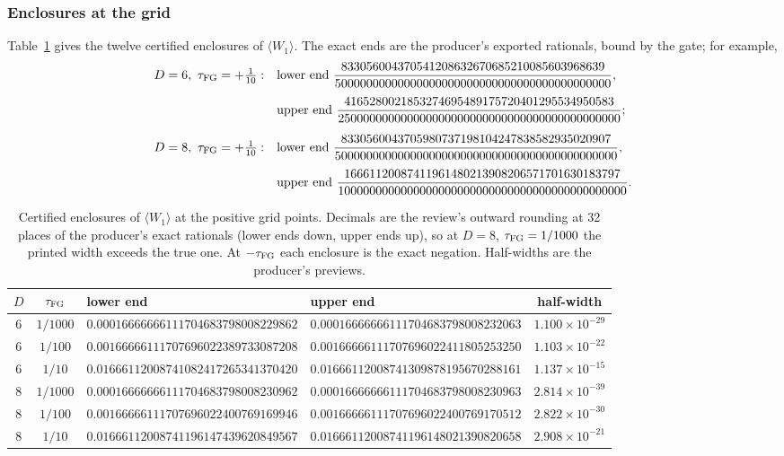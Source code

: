 \subsubsection{Enclosures at the grid}
\label{sec:az2-enclosures}
Table~\ref{tab:az2-enclosures} gives the twelve certified enclosures of
$\langle W_1\rangle$. The exact ends are the producer's exported rationals,
bound by the gate; for example,
\begin{equation}
 \begin{aligned}
 D=6,\ \tau_{\mathrm{FG}}=+\tfrac1{10}:\quad&\text{lower end }
 \frac{833056004370541208632670685210085603968639}{50000000000000000000000000000000000000000000},\\[4pt]
 &\text{upper end }
 \frac{4165280021853274695489175720401295534950583}{250000000000000000000000000000000000000000000};\\[6pt]
 D=8,\ \tau_{\mathrm{FG}}=+\tfrac1{10}:\quad&\text{lower end }
 \frac{8330560043705980737198104247838582935020907}{500000000000000000000000000000000000000000000},\\[4pt]
 &\text{upper end }
 \frac{16661120087411961480213908206571701630183797}{1000000000000000000000000000000000000000000000}.
 \end{aligned}
 \label{eq:az2-example}
\end{equation}

\begin{table}[htbp]
\centering\footnotesize
\caption{Certified enclosures of $\langle W_1\rangle$ at the positive grid
points. Decimals are the review's outward rounding at 32 places of the
producer's exact rationals (lower ends down, upper ends up), so at $D=8$,
$\tau_{\mathrm{FG}}=1/1000$ the printed width exceeds the true one. At $-\tau_{\mathrm{FG}}$ each
enclosure is the exact negation. Half-widths are the producer's previews.}
\label{tab:az2-enclosures}
\begin{tabular}{@{}ccllc@{}}
\toprule
$D$ & $\tau_{\mathrm{FG}}$ & lower end & upper end & half-width\\
\midrule
6 & $1/1000$ & $0.00016666666111704683798008229862$ & $0.00016666666111704683798008232063$ & $1.100\times10^{-29}$\\
6 & $1/100$ & $0.00166666111707696022389733087208$ & $0.00166666111707696022411805253250$ & $1.103\times10^{-22}$\\
6 & $1/10$ & $0.01666112008741082417265341370420$ & $0.01666112008741309878195670288161$ & $1.137\times10^{-15}$\\[2pt]
8 & $1/1000$ & $0.00016666666111704683798008230962$ & $0.00016666666111704683798008230963$ & $2.814\times10^{-39}$\\
8 & $1/100$ & $0.00166666111707696022400769169946$ & $0.00166666111707696022400769170512$ & $2.822\times10^{-30}$\\
8 & $1/10$ & $0.01666112008741196147439620849567$ & $0.01666112008741196148021390820658$ & $2.908\times10^{-21}$\\
\bottomrule
\end{tabular}
\end{table}

